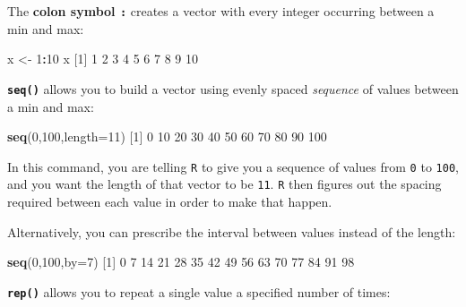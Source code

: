 \documentclass[
]{book}
\newenvironment{Shaded}{\begin{snugshade}}{\end{snugshade}}
\newcommand{\AttributeTok}[1]{\textcolor[rgb]{0.13,0.29,0.53}{#1}}
\newcommand{\DecValTok}[1]{\textcolor[rgb]{0.00,0.00,0.81}{#1}}
\newcommand{\FunctionTok}[1]{\textcolor[rgb]{0.13,0.29,0.53}{\textbf{#1}}}
\newcommand{\NormalTok}[1]{#1}
\newcommand{\OtherTok}[1]{\textcolor[rgb]{0.56,0.35,0.01}{#1}}
\newcommand{\SpecialCharTok}[1]{\textcolor[rgb]{0.81,0.36,0.00}{\textbf{#1}}}
\begin{document}
The \textbf{colon symbol \texttt{:}} creates a vector with every integer occurring between a min and max:

\begin{Shaded}
\begin{Highlighting}[]
\NormalTok{x }\OtherTok{\textless{}{-}} \DecValTok{1}\SpecialCharTok{:}\DecValTok{10}
\NormalTok{x}
\NormalTok{ [}\DecValTok{1}\NormalTok{]  }\DecValTok{1}  \DecValTok{2}  \DecValTok{3}  \DecValTok{4}  \DecValTok{5}  \DecValTok{6}  \DecValTok{7}  \DecValTok{8}  \DecValTok{9} \DecValTok{10}
\end{Highlighting}
\end{Shaded}

\textbf{\texttt{seq()}} allows you to build a vector using evenly spaced \emph{sequence} of values between a min and max:

\begin{Shaded}
\begin{Highlighting}[]
\FunctionTok{seq}\NormalTok{(}\DecValTok{0}\NormalTok{,}\DecValTok{100}\NormalTok{,}\AttributeTok{length=}\DecValTok{11}\NormalTok{)}
\NormalTok{ [}\DecValTok{1}\NormalTok{]   }\DecValTok{0}  \DecValTok{10}  \DecValTok{20}  \DecValTok{30}  \DecValTok{40}  \DecValTok{50}  \DecValTok{60}  \DecValTok{70}  \DecValTok{80}  \DecValTok{90} \DecValTok{100}
\end{Highlighting}
\end{Shaded}

In this command, you are telling \texttt{R} to give you a sequence of values from \texttt{0} to \texttt{100}, and you want the length of that vector to be \texttt{11}. \texttt{R} then figures out the spacing required between each value in order to make that happen.

Alternatively, you can prescribe the interval between values instead of the length:

\begin{Shaded}
\begin{Highlighting}[]
\FunctionTok{seq}\NormalTok{(}\DecValTok{0}\NormalTok{,}\DecValTok{100}\NormalTok{,}\AttributeTok{by=}\DecValTok{7}\NormalTok{)}
\NormalTok{ [}\DecValTok{1}\NormalTok{]  }\DecValTok{0}  \DecValTok{7} \DecValTok{14} \DecValTok{21} \DecValTok{28} \DecValTok{35} \DecValTok{42} \DecValTok{49} \DecValTok{56} \DecValTok{63} \DecValTok{70} \DecValTok{77} \DecValTok{84} \DecValTok{91} \DecValTok{98}
\end{Highlighting}
\end{Shaded}

\textbf{\texttt{rep()}} allows you to repeat a single value a specified number of times:
\end{document}
